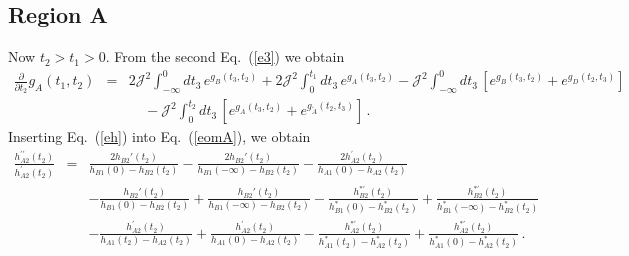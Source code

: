 \documentclass[prx,aps,onecolumn,amsfonts,showpacs,superscriptaddress,preprint,eqsecnum]
{revtex4-1}
\def\bea{\begin{eqnarray}}
\def\eea{\end{eqnarray}}
\newcommand{\nn}{\nonumber \\}
\begin{document}
\subsection{Region A}

Now $t_2 >  t_1 > 0$. 
From the second Eq.~(\ref{e3}) we obtain
\bea
  \frac{\partial}{ \partial t_2} g_A (t_1,t_2) &=& 2\mathcal{J}^2   \int_{-\infty}^{0} dt_3  \, e^{g_B (t_3,t_2)} 
  + 2\mathcal{J}^2   \int_{0}^{t_1} dt_3  \, e^{g_A (t_3,t_2)}
-  \mathcal{J}^2  \int_{-\infty}^{0} dt_3  \,  \left[ e^{g_B (t_3,t_2)} + e^{g_D (t_2,t_3)} \right] \nn &~&~~~~~
-  \mathcal{J}^2  \int_{0}^{t_2} dt_3  \,  \left[ e^{g_A (t_3,t_2)} + e^{g_{\widetilde{A}} (t_2,t_3)} \right]\,. \label{eomA}
\eea
Inserting Eq.~(\ref{eh}) into Eq.~(\ref{eomA}), we obtain
\bea
\frac{h_{A2}^{\prime\prime} (t_2)}{h_{A2}^{\prime} (t_2)} &=&  \frac{2 h_{B2}' (t_2)}{h_{B1} (0) - h_{B2} (t_2)} - \frac{2 h_{B2}' (t_2)}{h_{B1} (-\infty) - h_{B2} (t_2)} - \frac{2 h_{A2}^{\prime} (t_2)}{h_{A1} (0) - h_{A2} (t_2)} \label{eomA5}
\\ &~&
- \frac{h_{B2}' (t_2)}{h_{B1} (0) - h_{B2} (t_2)}
+ \frac{h_{B2}' (t_2)}{h_{B1} (-\infty) - h_{B2} (t_2)}
- \frac{h_{B2}^{\ast\prime} (t_2)}{h_{B1}^\ast (0) - h_{B2}^\ast (t_2)}
+ \frac{h_{B2}^{\ast\prime} (t_2)}{h_{B1}^\ast (-\infty) - h_{B2}^\ast (t_2)} \nn
&~& - \frac{h_{A2}^{\prime} (t_2)}{h_{A1} (t_2) - h_{A2} (t_2)}
+ \frac{h_{A2}^{\prime} (t_2)}{h_{A1} (0) - h_{A2} (t_2)}
- \frac{h_{A2}^{\ast\prime} (t_2)}{h_{A1}^\ast (t_2) - h_{A2}^\ast (t_2)}
+ \frac{h_{A2}^{\ast\prime} (t_2)}{h_{A1}^\ast (0) - h_{A2}^\ast (t_2)} \,.
\nonumber
\eea
\end{document}
